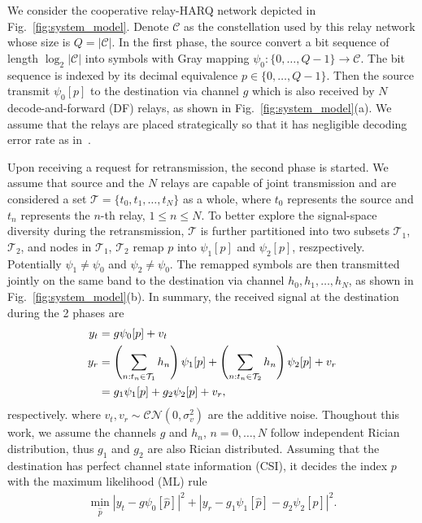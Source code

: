 \documentclass[conference]{IEEEtran}
\begin{document}
We consider the cooperative relay-HARQ network depicted in
Fig.~\ref{fig:system_model}. Denote $\mathcal{C}$ as the constellation used by
this relay network whose size is $Q=|\mathcal{C}|$. In
the first phase, the source convert a bit sequence of length
$\log_2|\mathcal{C}|$ into symbols with Gray mapping $\psi_0:
\{0,\ldots,Q - 1\}\rightarrow \mathcal{C}$. The bit sequence is
indexed by its decimal equivalence $p\in \{0,\ldots,Q - 1\}$.
Then the source transmit $\psi_0[p]$ to the destination via channel $g$
which is also received by $N$ decode-and-forward (DF) relays, as shown in
Fig.~\ref{fig:system_model}(a).
We assume that the relays are placed strategically so that it has
negligible decoding error rate as in~\cite{ryu2011ber}. 

Upon receiving a request for retransmission, the second phase is started. We
assume that source and the $N$ relays are capable of joint transmission and are
considered a set $\mathcal{T} = \{t_0,t_1,\ldots,t_N\}$ as a
whole, where $t_0$ represents the source and $t_n$ represents the
$n$-th relay, $1\leq n\leq N$. To better explore the signal-space diversity
during the retransmission, $\mathcal{T}$ is further partitioned into two subsets
$\mathcal{T}_1$, $\mathcal{T}_2$, and nodes in $\mathcal{T}_1$, $\mathcal{T}_2$
remap $p$ into $\psi_1[p]$ and $\psi_2[p]$, reszpectively. Potentially
$\psi_1\not=\psi_0$ and $\psi_2\not=\psi_0$. The remapped symbols are then
transmitted jointly on the same band to the destination via channel $h_0,
h_1,\ldots, h_N$, as shown in Fig.~\ref{fig:system_model}(b). In summary, the
received signal at the destination during the 2 phases are
\begin{subequations}
    \begin{align}
       y_t & = g\psi_0[p] + v_t \\
       y_r & = \left(\sum_{n:t_n\in\mathcal{T}_1}h_n\right)\psi_1[p] +
       \left(\sum_{n:t_n\in\mathcal{T}_2}h_n\right)\psi_2[p] + v_r \notag \\
       & = g_1\psi_1[p] + g_2\psi_2[p] + v_r,
    \end{align}
\end{subequations}
respectively. where $v_t, v_r\sim\mathcal{CN}(0,\sigma_v^2)$ are the additive
noise. Thoughout this work, we assume the channels $g$ and $h_n$, $n=0,\ldots,
N$ follow independent Rician distribution, thus $g_1$ and $g_2$ are also Rician
distributed.%
Assuming that the destination has perfect channel state information (CSI), it
decides the index $p$ with the maximum likelihood (ML) rule
\begin{align}
    \min_{\hat{p}} |y_t - g\psi_0[\hat{p}]|^2 + |y_r-
    g_1\psi_1[\hat{p}] - g_2\psi_2[\hat{p}]|^2.
    \label{eq:ML}
\end{align}
\end{document}
